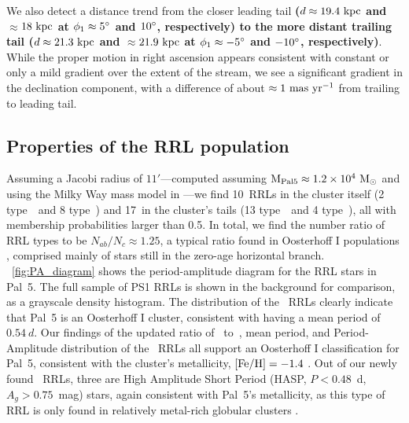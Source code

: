 \documentclass[twocolumn]{aastex63}
\newcommand{\sa}[1]{{\color{teal} SP: #1}}
\newcommand{\changes}[1]{{\textbf{#1}}}
\newcommand{\NRRcl}{10}     %
\newcommand{\NRRtails}{17} %
\begin{document}
We also detect a distance trend from the closer leading tail \changes{($d \approx 19.4~\mathrm{kpc}$ and $\approx$$18~\mathrm{kpc}$ at $\phi_1 \approx 5\mbox{$^\circ$}$ and $10\mbox{$^\circ$}$, respectively) to the more distant trailing tail ($d \approx 21.3~\mathrm{kpc}$ and $\approx$$21.9~\mathrm{kpc}$ at $\phi_1 \approx -5\mbox{$^\circ$}$ and $-10\mbox{$^\circ$}$, respectively)}.
While the proper motion in right ascension appears consistent with constant or only a mild gradient over the extent of the stream, we see a significant gradient in the declination component, with a difference of about $\approx 1~\mathrm{mas}~\mathrm{yr}^{-1}$ from trailing to leading tail.

\subsection{Properties of the RRL population}

Assuming a Jacobi radius of $11'$---computed assuming $\textrm{M}_{\rm Pal 5} \approx 1.2\times10^4~\mathrm{M}_\odot$ \citep{Kuepper:2015} and using the Milky Way mass model in \citet{gala}---we find \NRRcl\ RRLs in the cluster itself (2 type~\typeab\ and 8 type~\typec) and \NRRtails\ in the cluster's tails (13 type~\typeab\ and 4 type~\typec), all with membership probabilities larger than 0.5. In total, we find the number ratio of RRL types to be $N_{ab} / N_{c} \approx 1.25$, a typical ratio found in Oosterhoff I populations \citep{Smith:1995},  comprised mainly of stars still in the zero-age horizontal branch. \figurename~\ref{fig:PA_diagram} shows the period-amplitude diagram for the RRL stars in Pal~5. The full sample of PS1 RRLs is shown in the background for comparison, as a grayscale density histogram. The distribution of the \typeab~RRLs clearly indicate that Pal~5 is an Oosterhoff I cluster, consistent with having a mean period of $0.54~d$. Our findings of the updated ratio of \rrab~to~\rrc, mean period, and Period-Amplitude distribution of the \rrab\ RRLs all support an Oosterhoff I classification for Pal~5, consistent with the cluster's metallicity, $[\mathrm{Fe}/\mathrm{H}]=-1.4$ \citep{Dotter:2011}.
Out of our newly found \rrab\ RRLs, three are High Amplitude Short Period (HASP, $P <0.48$~d, $A_g>0.75$~mag) stars, again consistent with Pal~5's metallicity, as this type of RRL is only found in relatively metal-rich globular clusters  \citep[$\FeH>-1.5$;][]{Monelli:2017}.
\end{document}
